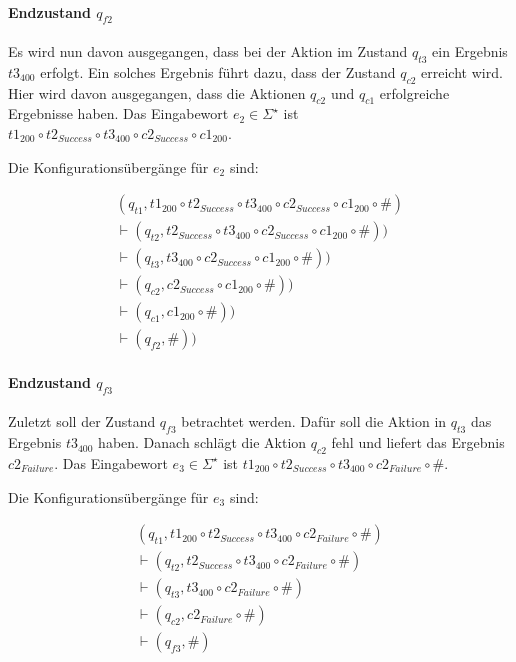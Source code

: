 \paragraph{Endzustand $q_{f2}$}
Es wird nun davon ausgegangen, dass bei der Aktion im Zustand $q_{t3}$ ein Ergebnis $t3_{400}$ erfolgt. Ein solches Ergebnis führt dazu, dass der Zustand $q_{c2}$ erreicht wird. Hier wird davon ausgegangen, dass die Aktionen $q_{c2}$ und $q_{c1}$ erfolgreiche Ergebnisse haben. Das Eingabewort $e_2 \in \Sigma^{\star}$ ist $t1_{200} \circ t2_{Success} \circ t3_{400} \circ c2_{Success} \circ c1_{200}$.

Die Konfigurationsübergänge für $e_2$ sind:

\begin{align*}
(q_{t1}, t1_{200} \circ t2_{Success} \circ t3_{400} \circ c2_{Success} \circ c1_{200} \circ \#)\\
\vdash (q_{t2}, t2_{Success} \circ t3_{400} \circ c2_{Success} \circ c1_{200} \circ \#))\\
\vdash (q_{t3}, t3_{400} \circ c2_{Success} \circ c1_{200} \circ \#))\\
\vdash (q_{c2}, c2_{Success} \circ c1_{200} \circ \#))\\
\vdash (q_{c1}, c1_{200} \circ \#))\\
\vdash (q_{f2}, \#))
\end{align*}


\paragraph{Endzustand $q_{f3}$}
Zuletzt soll der Zustand $q_{f3}$ betrachtet werden. Dafür soll die Aktion in $q_{t3}$ das Ergebnis $t3_{400}$ haben. Danach schlägt die Aktion $q_{c2}$ fehl und liefert das Ergebnis $c2_{Failure}$. Das Eingabewort $e_3 \in \Sigma^{\star}$ ist $t1_{200} \circ t2_{Success} \circ t3_{400} \circ c2_{Failure} \circ \#$.

Die Konfigurationsübergänge für $e_3$ sind:

\begin{align*}
(q_{t1}, t1_{200} \circ t2_{Success} \circ t3_{400} \circ c2_{Failure} \circ \#) \\
\vdash (q_{t2}, t2_{Success} \circ t3_{400} \circ c2_{Failure} \circ \#) \\
\vdash (q_{t3}, t3_{400} \circ c2_{Failure} \circ \#) \\
\vdash (q_{c2}, c2_{Failure} \circ \#) \\
\vdash (q_{f3}, \#) \\
\end{align*}

